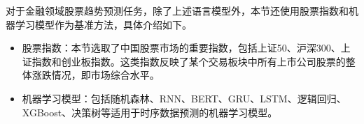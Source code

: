 对于金融领域股票趋势预测任务，除了上述语言模型外，本节还使用股票指数和机器学习模型作为基准方法，具体介绍如下。

\begin{itemize}[topsep = 0 pt, itemsep= 0 pt, parsep=0pt, partopsep=0pt, leftmargin=36pt, itemindent=0pt, labelsep=6pt, listparindent=24pt]
	\item 股票指数：本节选取了中国股票市场的重要指数，包括上证50、沪深300、上证指数和创业板指数。这类指数反映了某个交易板块中所有上市公司股票的整体涨跌情况，即市场综合水平。
	\item 机器学习模型：包括随机森林\cite{DBLP:journals/pami/Ho98}、RNN\cite{rumelhart1986learning}、BERT\cite{DBLP:conf/naacl/DevlinCLT19}、GRU\cite{DBLP:conf/emnlp/ChoMGBBSB14}、LSTM\cite{DBLP:journals/neco/HochreiterS97}、逻辑回归\cite{cox1958regression}、XGBoost\cite{DBLP:conf/kdd/ChenG16}、决策树\cite{DBLP:books/mk/Quinlan93}等适用于时序数据预测的机器学习模型。
\end{itemize}

